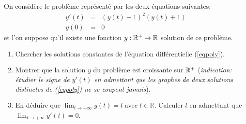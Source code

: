 \begin{exo}
     On considère le problème représenté par les deux équations suivantes:
            \begin{eqnarray}
                y'(t)&=&(y(t)-1)^2(y(t)+1)\label{eqpoly}\\
                y(0)&=&0 \label{cipoly}
            \end{eqnarray}
            et l'on suppose qu'il existe une fonction $y:\mathbb{R}^+\to\mathbb{R}$ solution de ce problème.
            \begin{enumerate}
                \item Chercher les solutions constantes de l'équation différentielle (\ref{eqpoly}).
                \item Montrer que la solution $y$ du problème est croissante sur $\mathbb{R}^+$ ({\it indication: étudier le signe de $y'(t)$ en admettant que les graphes de
                deux solutions distinctes de (\ref{eqpoly}) ne se coupent jamais}).
                \item En déduire que $\displaystyle \lim_{t\to +\infty}y(t)=l$ avec $l \in \mathbb{R}$. Calculer $l$ en admettant que $\displaystyle \lim_{t\to +\infty}y'(t)=0$.
            \end{enumerate}
  
\end{exo}

